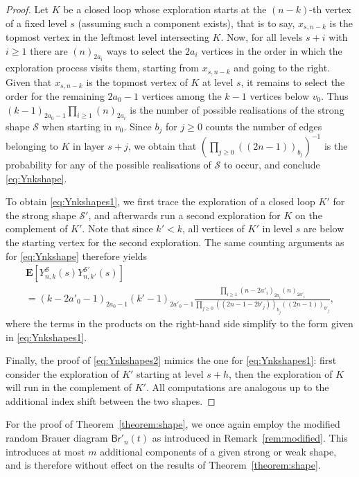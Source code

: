 \documentclass[a4paper,11pt,reqno]{amsart}
\newcommand{\paul}[1]{\todo[color=yellow!70,inline]{Paul: #1}}
\newcommand{\bE}{\mathbf{E}}
\newcommand{\Br}{\mathsf{Br}}
\newcommand{\shape}{\mathscr{S}}
\newcommand{\fdf}[1]{(\!(#1)\!)}
\theoremstyle{definition}
\begin{document}
\begin{proof}
 Let $K$ be a closed loop whose exploration starts at the $(n-k)$-th vertex of a fixed level $s$ (assuming such a component exists), that is to say, $x_{s,n-k}$ is the topmost vertex in the leftmost level intersecting $K$. 
 Now, for all levels $s+i$ with $i\geq 1$ there are $(n)_{2a_i}$ ways to select the $2a_i$ vertices in the order in which the exploration process visits them, starting from $x_{s,n-k}$ and going to the right. Given that $x_{s,n-k}$ is the topmost vertex of $K$ at level $s$, it remains to select the order for the remaining $2a_0-1$ vertices among the $k-1$ vertices below $v_0$. Thus $(k-1)_{2a_0-1}\prod_{i\geq 1} (n)_{2a_i}$ is the number of possible realisations of the strong shape $\shape$ when starting in $v_0$. 
 Since $b_j$ for $j\geq0$ counts the number of edges belonging to $K$ in layer $s+j$, we obtain that $\left(\prod_{j\geq0} \fdf{2n-1}_{b_j}\right)^{-1}$ is the probability for any of the possible realisations of $\shape$ to occur, and conclude \eqref{eq:Ynkshape}.
 
 
 To obtain \eqref{eq:Ynkshapes1}, we first trace the exploration of a closed loop $K'$ for the strong shape $\shape'$, and afterwards run a second exploration for $K$ on the complement of $K'$. Note that since $k'<k$, all vertices of $K'$ in level $s$ are below the starting vertex for the second exploration. The same counting arguments as for \eqref{eq:Ynkshape} therefore yields
 \begin{multline*}
  \bE\left[Y_{n,k}^\shape(s)Y_{n,k'}^{\shape'}(s)\right] \\
  = (k-2a'_0-1)_{2a_0-1}(k'-1)_{2a'_0-1}\frac{\prod_{i\geq 1} (n-2a'_i)_{2a_i}(n)_{2a'_i}}{\prod_{j\geq 0} \fdf{2n-1-2b'_j}_{b_j}\fdf{2n-1}_{b'_j}},
 \end{multline*}
 where the terms in the products on the right-hand side simplify to the form given in \eqref{eq:Ynkshapes1}. 
 
 Finally, the proof of \eqref{eq:Ynkshapes2} mimics the one for \eqref{eq:Ynkshapes1}: first consider the exploration of $K'$ starting at level $s+h$, then the exploration of $K$ will run in the complement of $K'$. All computations are analogous up to the additional index shift between the two shapes. 
\end{proof}

For the proof of Theorem~\ref{theorem:shape}, we once again employ the modified random Brauer diagram $\Br'_n(t)$ as introduced in Remark~\ref{rem:modified}. This introduces at most $m$ additional components of a given strong or weak shape, and is therefore without effect on the results of Theorem~\ref{theorem:shape}.
\end{document}
